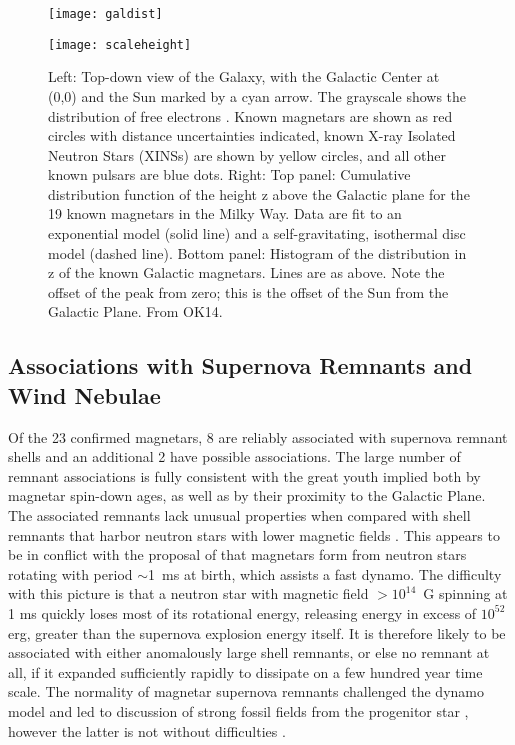 \begin{figure}
\begin{minipage}{2.9in}
\texttt{[image: galdist]}
\end{minipage}
\hspace{-1.55in}
\begin{minipage}{2.9in}
\texttt{[image: scaleheight]}
\end{minipage}
\caption{Left:  Top-down view of the Galaxy, with the Galactic Center at  (0,0) and the Sun marked by a cyan arrow. 
The grayscale shows the distribution of free electrons \citep{cl01}. Known magnetars are shown as red circles with 
distance uncertainties indicated, known X-ray Isolated Neutron Stars (XINSs) are shown by yellow circles, and 
all other known pulsars are blue dots.  Right:  Top panel: Cumulative distribution function of the height z above the Galactic plane for the 
19 known magnetars in the Milky Way. Data are fit to an exponential model (solid line) and a self-gravitating, isothermal disc 
model (dashed line).  Bottom panel: Histogram of the distribution in z of the known Galactic magnetars. Lines are as above.
Note the offset of the peak from zero; this is the offset of the Sun from the Galactic Plane.  From OK14.}
\label{fig:galdist}
\end{figure}

\subsection{Associations with Supernova Remnants and Wind Nebulae}
\label{sec:snrs}

Of the 23 confirmed magnetars, 8 are reliably associated with supernova remnant shells and an additional
2 have possible associations.  The large number of remnant associations is fully consistent with the great youth implied
both by magnetar spin-down ages, as well as by their proximity to the Galactic Plane.  
The associated remnants lack unusual properties when compared
with shell remnants that harbor neutron stars with lower magnetic fields \citep{vk06,mrtp14}.   
This appears to be in conflict with the proposal of \citet{dt92a} that
magnetars form from neutron stars rotating with period $\sim$1~ms at birth, which assists a fast dynamo.
The difficulty with this picture is that a neutron star with magnetic field $> 10^{14}$~G spinning at 1 ms 
quickly loses most of its rotational energy, releasing energy
in excess of $10^{52}$ erg, greater than the supernova explosion energy itself.  It is therefore likely to be associated with
either anomalously large shell remnants, or else no remnant at all, if it expanded sufficiently rapidly to dissipate on a few hundred year time scale.
The normality of magnetar supernova remnants challenged the dynamo model and led to discussion of strong fossil fields from the progenitor star \citep{fw06},
however the latter is not without difficulties \citep[see, e.g.][]{spr08}.


